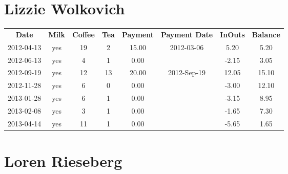\section{Lizzie Wolkovich}

\begin{center}
\begin{tabular}{cccccccc}
\textbf{Date} & \textbf{Milk} & \textbf{Coffee} & \textbf{Tea} & \textbf{Payment} & \textbf{Payment Date} & \textbf{InOuts} & \textbf{Balance} \\
2012-04-13 & yes & 19 &  2 & 15.00 & 2012-03-06 &  5.20 &  5.20\\ 
2012-06-13 & yes &  4 &  1 &  0.00 &  & -2.15 &  3.05\\ 
2012-09-19 & yes & 12 & 13 & 20.00 & 2012-Sep-19 & 12.05 & 15.10\\ 
2012-11-28 & yes &  6 &  0 &  0.00 &  & -3.00 & 12.10\\ 
2013-01-28 & yes &  6 &  1 &  0.00 &  & -3.15 &  8.95\\ 
2013-02-08 & yes &  3 &  1 &  0.00 &  & -1.65 &  7.30\\ 
2013-04-14 & yes & 11 &  1 &  0.00 &  & -5.65 &  1.65
\end{tabular}
\end{center}

\section{Loren Rieseberg}

